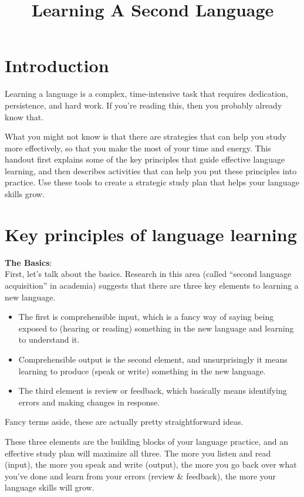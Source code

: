 \documentclass[../main.tex]{subfiles}
\title{Learning A Second Language}
\begin{document}
\maketitle
%
\section{Introduction}
Learning a language is a complex, time-intensive task that requires dedication,
persistence, and hard work. If you're reading this, then you probably already
know that.

What you might not know is that there are strategies that can help you study
more effectively, so that you make the most of your time and energy. This
handout first explains some of the key principles that guide effective language
learning, and then describes activities that can help you put these principles
into practice. Use these tools to create a strategic study plan that helps your
language skills grow.
%
\section{Key principles of language learning}

\textbf{The Basics}: \\
First, let's talk about the basics. Research in this area (called ``second
language acquisition'' in academia) suggests that there are three key elements to
learning a new language.
%
\begin{itemize}
  \item The first is comprehensible input, which is a fancy way of saying being
    exposed to (hearing or reading) something in the new language and learning
    to understand it.
  \item Comprehensible output is the second element, and unsurprisingly it means
    learning to produce (speak or write) something in the new language.
  \item The third element is review or feedback, which basically means
    identifying errors and making changes in response.
\end{itemize}
%
Fancy terms aside, these are actually pretty straightforward ideas.

These three elements are the building blocks of your language practice, and an
effective study plan will maximize all three. The more you listen and read
(input), the more you speak and write (output), the more you go back over what
you've done and learn from your errors (review \& feedback), the more your
language skills will grow.
\end{document}
